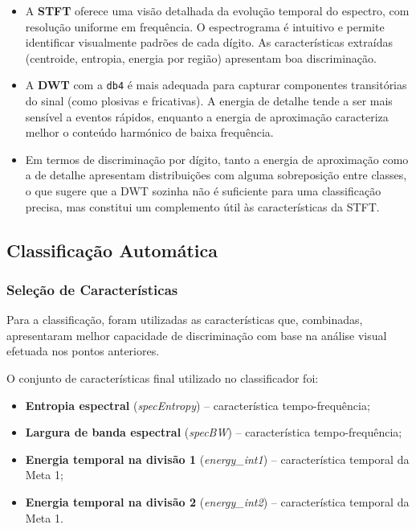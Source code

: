 \documentclass[12pt]{article}
\begin{document}
\begin{itemize}
    \item A \textbf{STFT} oferece uma visão detalhada da evolução temporal do espectro, com
    resolução uniforme em frequência. O espectrograma é intuitivo e permite identificar visualmente
    padrões de cada dígito. As características extraídas (centroide, entropia, energia por região)
    apresentam boa discriminação.

    \item A \textbf{DWT} com a \texttt{db4} é mais adequada para capturar componentes transitórias
    do sinal (como plosivas e fricativas). A energia de detalhe tende a ser mais sensível a eventos
    rápidos, enquanto a energia de aproximação caracteriza melhor o conteúdo harmónico de baixa
    frequência.

    \item Em termos de discriminação por dígito, tanto a energia de aproximação como a de detalhe
    apresentam distribuições com alguma sobreposição entre classes, o que sugere que a DWT sozinha
    não é suficiente para uma classificação precisa, mas constitui um complemento útil às
    características da STFT.
\end{itemize}

\subsection{Classificação Automática}

\subsubsection{Seleção de Características}

Para a classificação, foram utilizadas as características que, combinadas, apresentaram melhor
capacidade de discriminação com base na análise visual efetuada nos pontos anteriores.

O conjunto de características final utilizado no classificador foi:

\begin{itemize}
    \item \textbf{Entropia espectral} (\textit{specEntropy}) -- característica tempo-frequência;
    \item \textbf{Largura de banda espectral} (\textit{specBW}) -- característica tempo-frequência;
    \item \textbf{Energia temporal na divisão 1} (\textit{energy\_int1}) -- característica temporal
    da Meta 1;
    \item \textbf{Energia temporal na divisão 2} (\textit{energy\_int2}) -- característica temporal
    da Meta 1.
\end{itemize}
\end{document}
